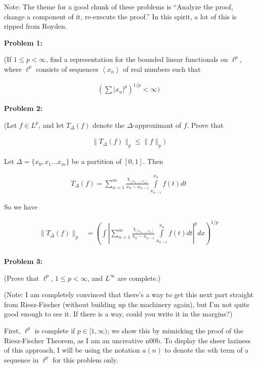 \documentclass[a4paper,12pt]{article}
\newcommand{\shunt}{\vspace{20mm}}
\newcommand{\absval}[1]{\left\lvert #1 \right\rvert}
\newcommand{\norm}[1]{\|#1\|}
\newcommand{\anbrack}[1]{\left\langle #1 \right\rangle}
\newcommand{\De}{\Delta}
\begin{document}
Note: The theme for a good chunk of these problems is ``Analyze the proof, change a component of it, re-execute the proof.'' In this spirit, a lot of this is ripped from Royden.

{\bf Problem 1:} %

(If $1 \leq p < \infty$, find a representation for the bounded linear functionals on $\ell^p$, where $\ell^p$ consists of sequences $\anbrack{x_n}$ of real numbers such that

\begin{align*}
(\sum\absval{x_n}^p)^{1/p}<\infty ) 
\end{align*}

\shunt

{\bf Problem 2:} 

(Let $f \in L^p$, and let $T_\De(f)$ denote the $\De$-approximant of $f$. Prove that

\begin{align*}
\norm{T_\De(f)}_p \leq \norm{f}_p)
\end{align*}

Let $\De = \{x_0,x_1 \ldots x_m\}$ be a partition of $[0,1]$. Then 

\begin{align*}
T_\De(f) = \sum\limits_{n=1}^{m} \frac{\chi_{[x_{n-1},x_n]}}{x_n-x_{n-1}}\int\limits_{x_{n-1}}^{x_n} f(t)dt
\end{align*} 

So we have %

\begin{align*}
\norm{T_\De(f)}_p &= \left(\int \absval{\sum\limits_{n=1}^{m} \frac{\chi_{[x_{n-1},x_n]}}{x_n-x_{n-1}}\int\limits_{x_{n-1}}^{x_n} f(t)dt}^pdx\right)^{1/p}\\
\end{align*}

\shunt

{\bf Problem 3:} 

(Prove that $\ell^p$, $1\leq p < \infty$, and $L^\infty$ are complete.)

(Note: I am completely convinced that there's a way to get this next part straight from Riesz-Fischer (without building up the machinery again), but I'm not quite good enough to see it. If there is a way, could you write it in the margins?)

First, $\ell^p$ is complete if $p \in [1, \infty)$; we show this by mimicking the proof of the Riesz-Fischer Theorem, as I am an uncreative n00b. To display the sheer laziness of this approach, I will be using the notation $a(n)$ to denote the $n$th term of a sequence in $\ell^p$ for this problem only.
\end{document}
